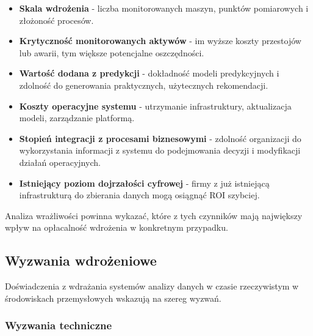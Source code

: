 \begin{itemize}
    \item \textbf{Skala wdrożenia} - liczba monitorowanych maszyn, punktów pomiarowych i złożoność procesów.
    \item \textbf{Krytyczność monitorowanych aktywów} - im wyższe koszty przestojów lub awarii, tym większe potencjalne oszczędności.
    \item \textbf{Wartość dodana z predykcji} - dokładność modeli predykcyjnych i zdolność do generowania praktycznych, użytecznych rekomendacji.
    \item \textbf{Koszty operacyjne systemu} - utrzymanie infrastruktury, aktualizacja modeli, zarządzanie platformą.
    \item \textbf{Stopień integracji z procesami biznesowymi} - zdolność organizacji do wykorzystania informacji z systemu do podejmowania decyzji i modyfikacji działań operacyjnych.
    \item \textbf{Istniejący poziom dojrzałości cyfrowej} - firmy z już istniejącą infrastrukturą do zbierania danych mogą osiągnąć ROI szybciej.
\end{itemize}

Analiza wrażliwości powinna wykazać, które z tych czynników mają największy wpływ na opłacalność wdrożenia w konkretnym przypadku.

\subsection{Wyzwania wdrożeniowe}
\label{subsec:wyzwania_wdrozeniowe}

Doświadczenia z wdrażania systemów analizy danych w czasie rzeczywistym w środowiskach przemysłowych wskazują na szereg wyzwań.

\subsubsection{Wyzwania techniczne}
\label{subsubsec:wyzwania_techniczne}

